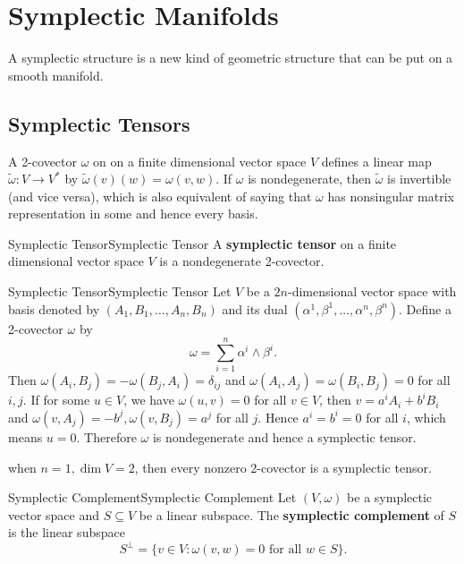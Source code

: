 \documentclass[../main.tex]{subfiles}
\begin{document}
\chapter{Symplectic Manifolds}
A symplectic structure is a new kind of geometric structure that can be put on a smooth manifold.

\section{Symplectic Tensors}
A 2-covector $\omega$ on on a finite dimensional vector space $V$ defines a linear map $\tilde{\omega}:V\to V^*$ by $\tilde{\omega}(v)(w)=\omega(v,w)$. If $\omega$ is nondegenerate, then $\tilde{\omega}$ is invertible (and vice versa), which is also equivalent of saying that $\omega$ has nonsingular matrix representation in some and hence every basis.

\begin{definition}{Symplectic Tensor}{Symplectic Tensor}
  A \textbf{symplectic tensor} on a finite dimensional vector space $V$ is a nondegenerate 2-covector.
\end{definition}

\begin{example}{Symplectic Tensor}{Symplectic Tensor}
  Let $V$ be a $2n$-dimensional vector space with basis denoted by $(A_1, B_1, \dots, A_n, B_n)$ and its dual $(\alpha^1, \beta^1, \dots, \alpha^n, \beta^n)$. Define a 2-covector $\omega$ by
  \begin{equation}
    \omega = \sum_{i=1}^n \alpha^i\wedge \beta^i.
  \end{equation}
  Then $\omega(A_i, B_j) = -\omega(B_j, A_i) = \delta_{ij}$ and $\omega(A_i, A_j) = \omega(B_i, B_j) = 0$ for all $i, j$. If for some $u\in V$, we have $\omega(u, v) = 0$ for all $v\in V$, then $v = a^i A_i + b^i B_i$ and $\omega(v, A_j) = -b^j, \omega(v, B_j) = a^j$ for all $j$. Hence $a^i = b^i = 0$ for all $i$, which means $u = 0$. Therefore $\omega$ is nondegenerate and hence a symplectic tensor.

  when $n=1, \dim V = 2$, then every nonzero 2-covector is a symplectic tensor.
\end{example}

\begin{definition}{Symplectic Complement}{Symplectic Complement}
  Let $(V, \omega)$ be a symplectic vector space and $S \subseteq V$ be a linear subspace. The \textbf{symplectic complement} of $S$ is the linear subspace
  \begin{equation}
    S^\perp = \{v\in V: \omega(v, w) = 0 \text{ for all } w\in S\}.
  \end{equation}
\end{definition}
\end{document}
